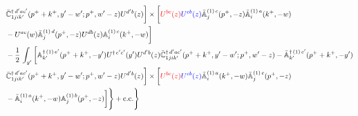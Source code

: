 \documentclass[aps,prd,amsmath,amssymb,nofootinbib]{revtex4-2}
\def\mf#1{\mathbb{#1}}
\numberwithin{equation}{section}
\begin{document}
\begin{align}
& \Bar{\mf{C}}^{\dagger\, d^{\prime}ac^{\prime}}_{1jik^{\prime}}(p^{+}+k^{+},y^{\prime}-w^{\prime}; p^{+},w^{\prime}-z)U^{d^{\prime}b}(z)\bigg] \times  \bigg[\textcolor{red}{U^{bc}(z)}\textcolor{blue}{U^{cb}(z)}\Bar{\mf{A}}^{(1)\, c}_{j}(p^{+},-z)\Bar{\mf{A}}^{(1)\, a}_{i}(k^{+},-w)\notag \\ & -U^{ac}(w) \Bar{\mf{A}}^{(1)\, d}_{j}(p^{+},-z)U^{db}(z) \mf{A}^{(1)\, c}_{i}(k^{+},- w)\bigg]\notag \\ & - \frac{1}{2}\,\int_{y^{\prime}}\bigg[\mf{A}^{\dagger\, (1)\,e^{\prime}}_{k^{\prime}}(p^{+}+k^{+},-y^{\prime})U^{\dagger\, e^{\prime}c^{\prime}}(y^{\prime})U^{d^{\prime}b}(z) \Bar{\mf{C}}^{\dagger\, d^{\prime}ac^{\prime}}_{1jik^{\prime}}(p^{+}+k^{+},y^{\prime}-w^{\prime}; p^{+},w^{\prime}-z)  -\Bar{\mf{A}}^{\dagger\, (1)\,c^{\prime}}_{k^{\prime}}(p^{+}+k^{+},-y^{\prime})\notag \\ & \Bar{\mf{C}}^{\dagger\, d^{\prime}ac^{\prime}}_{1jik^{\prime}}(p^{+}+k^{+},y^{\prime}-w^{\prime}; p^{+},w^{\prime}-z)U^{d^{\prime}b}(z)\bigg] \times \bigg[\textcolor{red}{U^{bc}(z)}\textcolor{blue}{U^{cb}(z)}\Bar{\mf{A}}^{(1)\, a}_{i}(k^{+},- w)\Bar{\mf{A}}^{(1)\, c}_{j}(p^{+},-z)\notag \\ & -\Bar{\mf{A}}^{(1)\, a}_{i}(k^{+},- w) \mf{A}^{(1)\, b}_{j}(p^{+},- z)\bigg]\Bigg\} +  {\rm c.c.} \Bigg\}
\end{align}
\newpage
\appendix
\end{document}
